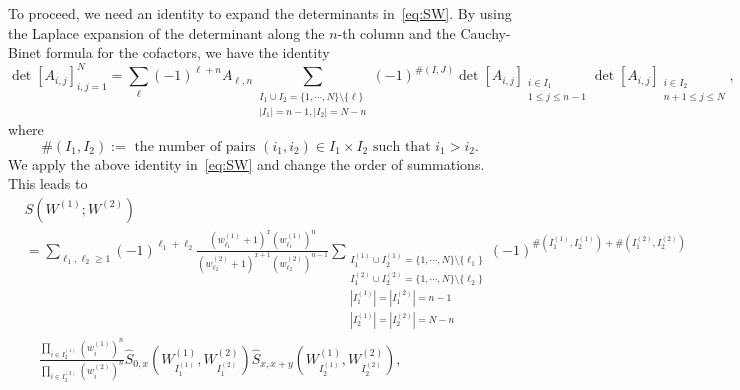 \documentclass{article}
\numberwithin{equation}{section}
\begin{document}
To proceed, we need an identity to expand the determinants in~\eqref{eq:SW}. By using the Laplace expansion of the determinant along the $n$-th column and the Cauchy-Binet formula for the cofactors, we have the identity
\begin{equation*}
	\det\left[A_{i,j}\right]_{i,j=1}^N 
	  = \sum_{\ell}(-1)^{\ell+n}A_{\ell,n}
	    \sum_{
	    	  \substack{ I_1\cup I_2=\{1,\cdots,N\}\setminus\{\ell\}\\
	    	  	         |I_1|=n-1, |I_2|=N-n
	    	           }
    	     }
         (-1)^{\#(I,J)}
         \det\left[A_{i,j}\right]_{\substack{i\in I_1 \\ 1\le j\le n-1}}
         \det\left[A_{i,j}\right]_{\substack{i\in I_2 \\ n+1\le j\le N}},
\end{equation*}
where
\begin{equation}
	\#(I_1,I_2):=\text{ the number of pairs $(i_1,i_2)\in I_1\times I_2$ such that $i_1>i_2$}.
\end{equation}
We apply the above identity in~\eqref{eq:SW} and change the order of summations. This leads to
\begin{equation}
	\label{eq:SW2}
	\begin{split}
		&S\left(W^{(1)};W^{(2)}\right)\\
		&=\sum_{\ell_1,\ell_2\ge1} (-1)^{\ell_1+\ell_2}
		               \frac{\left(w_{\ell_1}^{(1)} + 1\right)^x
		               	     \left(w_{\ell_1}^{(1)}\right)^n               	     
		                    }
		                    {\left(w_{\ell_2}^{(2)} + 1\right)^{x+1}
		                     \left(w_{\ell_2}^{(2)}\right)^{n-1}
		                    }
	       \sum_{\substack{
	     		                 I_1^{(1)} \cup I_2^{(1)}
	     		                  = \{1,\cdots,N\} \setminus\{\ell_1 \}\\
	     		                 I_1^{(2)} \cup I_2^{(2)}
	     		                  = \{1,\cdots,N\} \setminus\{\ell_2 \}\\
	     		                 |I_1^{(1)}| = |I_1^{(2)}| =n-1\\
	     		                 |I_2^{(1)}| = |I_2^{(2)}| =N-n
	     	                    }
	                 }
              (-1)^{\#(I_1^{(1)},I_2^{(1)}) +\#(I_1^{(2)},I_2^{(2)})}\\
&\quad           \frac{\prod_{i\in I_2^{(1)}} \left(w_i^{(1)}\right)^n}
                      {\prod_{i\in I_2^{(2)}} \left(w_i^{(2)}\right)^n}
                 \hat S_{0,x}\left( W^{(1)}_{I_1^{(1)}}, W^{(2)}_{I_1^{(2)}}\right)
                 \hat S_{x,x+y} \left( W^{(1)}_{I_2^{(1)}}, W^{(2)}_{I_2^{(2)}} \right),
	\end{split}
\end{equation}
\end{document}
